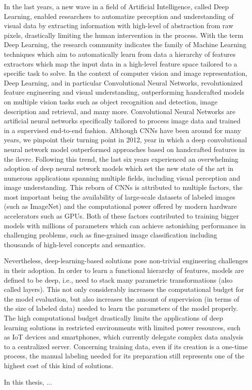 In the last years, a new wave in a field of Artificial Intelligence, called Deep Learning, enabled researchers to automatize perception and understanding of visual data by extracting information with high-level of abstraction from raw pixels, drastically limiting the human intervention in the process.
With the term Deep Learning, the research community indicates the family of Machine Learning techniques which aim to automatically learn from data a hierarchy of features extractors which map the input data in a high-level feature space tailored to a specific task to solve.
In the context of computer vision and image representation, Deep Learning, and in particular Convolutional Neural Networks, revolutionized feature engineering and visual understanding, outperforming handcrafted models on multiple vision tasks such as object recognition and detection, image description and retrieval,  and many more.
Convolutional Neural Networks are artificial neural networks specifically tailored to process image data and trained in a supervised end-to-end fashion.
Although CNNs have been around for many years, we pinpoint their turning point in 2012, year in which a deep convolutional neural network model outperformed approaches based on handcrafted features in the \acrlong{ilsvrc}.
Following this trend, the last six years experienced an overwhelming adoption of deep neural network models which set the new state of the art in numerous applications spanning multiple fields, including visual perception and image understanding.
This reborn of CNNs is attributed to multiple factors, the most important being the availability of large-scale datasets of labeled images (such as ImageNet) and the computational power offered by modern hardware accelerators such as GPUs.
Both of these factors contributed to training bigger models with millions of parameters which can achieve astonishing performance in challenging problems, such as fine-grained image classification including thousands of high-level concepts and semantics.

Nevertheless, deep-learning-based solutions pose non-trivial engineering challenges in their adoption.
In order to learn a functional hierarchy of features, models are defined to be deep, i.e., need to stack many parametric transformations (also called layers).
This not only considerably increases the computational budget for the model evaluation, but also increases the amount of supervision (in terms of the size of labeled data) needed to learn the parameters of the model properly.
The high computational budget drastically limits the applications of deep learning solutions in restricted environments with limited power resources, such as IoT devices and smartphones, which currently delegate complex data analysis to a centralized server.
Concerning training data, even if its creation is a one-time process, the manual labeling needed for its preparation still represents one of the highest cost of this kind of solutions.

In this thesis, ...



